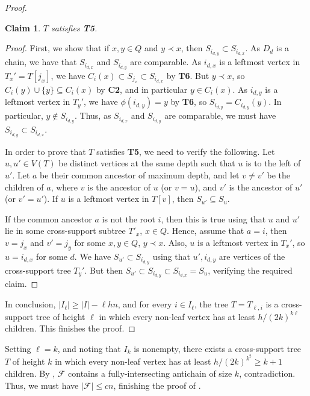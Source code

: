 \documentclass[11pt]{article}
\newtheorem{claim}[claim]{Claim}
\theoremstyle{definition}
\newcommand{\cF}{\mathcal{F}}
\begin{document}
\begin{proof}
\begin{claim}
$T$ satisfies \textbf{T5}.
\end{claim}

\begin{proof}
First, we show that if $x,y\in Q$ and $y\prec x$, then $S_{i_{d,y}}\subset S_{i_{d,x}}$. As $D_d$ is a chain, we have that $S_{i_{d,x}}$ and $S_{i_{d,y}}$ are comparable. As $i_{d,x}$ is a leftmost vertex in $T_x'=T[j_x]$, we have $C_{i}(x)\subset S_{j_x}\subset S_{i_{d,x}}$ by \textbf{T6}. But $y\prec x$, so $C_{i}(y)\cup\{y\}\subseteq C_{i}(x)$ by \textbf{C2}, and in particular $y\in C_i(x)$. As $i_{d,y}$ is a leftmost vertex in $T_{y}'$, we have $\phi(i_{d,y})=y$ by \textbf{T6}, so $S_{i_{d,y}}=C_{i_{d,y}}(y)$. In particular, $y\not\in S_{i_{d,y}}$. Thus, as $S_{i_{d,x}}$ and $S_{i_{d,y}}$ are comparable, we must have $S_{i_{d,y}}\subset S_{i_{d,x}}$.

In order to prove that $T$ satisfies \textbf{T5}, we need to verify the following. Let $u,u'\in V(T)$ be distinct vertices at the same depth such that $u$ is to the left of $u'$. Let $a$ be their common ancestor of maximum depth, and let $v\neq v'$ be the children of $a$, where $v$ is the ancestor of $u$ (or $v=u$), and $v'$ is the ancestor of $u'$ (or $v'=u'$). If $u$ is a leftmost vertex in $T[v]$, then $S_{u'}\subseteq S_u$.

If the common ancestor $a$ is not the root $i$, then this is true using that $u$ and $u'$ lie in some cross-support subtree $T'_x$, $x\in Q$. Hence, assume that $a=i$, then $v=j_x$ and $v'=j_y$ for some $x,y\in Q$, $y\prec x$. Also, $u$ is a leftmost vertex in $T_x'$, so $u=i_{d,x}$ for some $d$. We have $S_{u'}\subset S_{i_{d,y}}$ using that $u',i_{d,y}$ are vertices of the cross-support tree $T_y'$. But then $S_{u'}\subset S_{i_{d,y}}\subset S_{i_{d,x}}=S_u$, verifying the required claim.
\end{proof}

In conclusion, $|I_{\ell}|\geq |I|-\ell h n$, and for every $i\in I_{\ell}$, the tree $T=T_{\ell,i}$ is a cross-support tree of height $\ell$ in which every non-leaf vertex has at least $h/(2k)^{k\ell}$ children. This finishes the proof.
\end{proof}

Setting $\ell=k$, and noting that $I_k$ is nonempty, there exists a cross-support tree $T$ of height $k$ in which every non-leaf vertex has at least $h/(2k)^{k^2}\geq k+1$ children. By , $\cF$ contains a fully-intersecting antichain of size $k$, contradiction. Thus, we must have $|\cF|\leq cn$, finishing the proof of .
\end{document}
